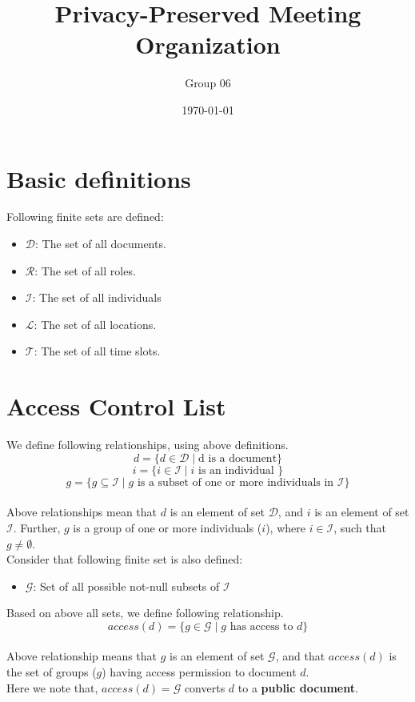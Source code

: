 \documentclass{article}
\title{Privacy-Preserved Meeting Organization}
\author{Group 06}
\date{\today} %
\begin{document}
\maketitle

\section{Basic definitions}

\noindent
Following finite sets are defined:
\begin{itemize}
    \item $\mathcal{D}$: The set of all documents.
    \item $\mathcal{R}$: The set of all roles.
    \item $\mathcal{I}$: The set of all individuals
    \item $\mathcal{L}$: The set of all locations.
    \item $\mathcal{T}$: The set of all time slots.
\end{itemize}

\section{Access Control List}
\noindent
We define following relationships, using above definitions.
\[ d = \{ d \in \mathcal{D} \mid \text{d is a document} \} \]
\[ i = \{ i \in \mathcal{I} \mid i \text{ is an individual } \} \]
\[ g = \{ g \subseteq \mathcal{I} \mid g \text{ is a subset of one or more individuals in } \mathcal{I} \} \] \\ 
\noindent
Above relationships mean that $d$ is an element of set $\mathcal{D}$, and $i$ is an element of set $\mathcal{I}$. Further, $g$ is a group of one or more individuals ($i$), where $i \in \mathcal{I}$, such that $g \ne \emptyset$.\\ 

\noindent
Consider that following finite set is also defined:
\begin{itemize}
    \item $\mathcal{G}$: Set of all possible not-null subsets of $\mathcal{I}$
\end{itemize}
Based on above all sets, we define following relationship.
\[ access(d) = \{ g \in \mathcal{G} \mid g \text{ has access to } d \} \] \\ 
\noindent
Above relationship means that $g$ is an element of set $\mathcal{G}$, and that $access(d)$ is the set of groups ($g$) having access permission to document $d$.\\ 
Here we note that, $access(d) = \mathcal{G}$ converts $d$ to a \textbf{public document}. \\ 
\end{document}
